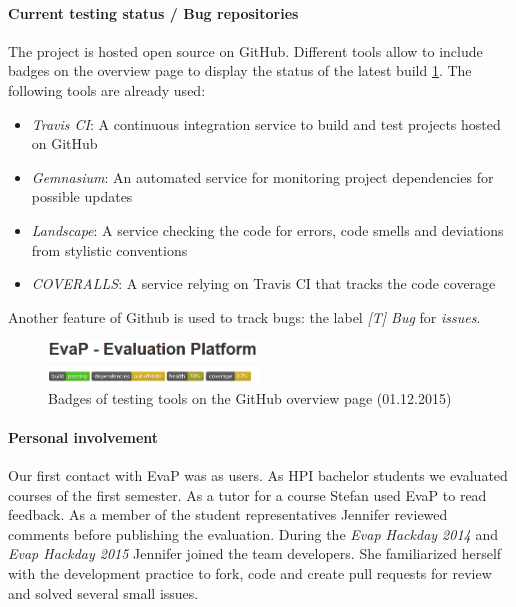 \paragraph{Current testing status / Bug repositories}
The project is hosted open source on GitHub.
Different tools allow to include badges on the overview page to display the status of the latest build \ref{fig:testing-tools}.
The following tools are already used:
\begin{itemize}
    \item \emph{Travis CI}: 
    A continuous integration service to build and test projects hosted on GitHub
    \item \emph{Gemnasium}:
     An automated service for monitoring project dependencies for possible updates
     \item \emph{Landscape}:
     A service checking the code for errors, code smells and deviations from stylistic conventions
     \item  \emph{COVERALLS}:
     A service relying on Travis CI that tracks the code coverage
\end{itemize}
Another feature of Github is used to track bugs: the label \emph{[T] Bug} for \emph{issues}.
\begin{figure}[h]
    \centering
    \includegraphics[width=0.5\textwidth, keepaspectratio]{graphics/testing-tools-github}
    \caption{Badges of testing tools on the GitHub overview page (01.12.2015)}
    \label{fig:testing-tools}
\end{figure}


\paragraph{Personal involvement}
Our first contact with EvaP was as users. 
As HPI bachelor students we evaluated courses of the first semester.
As a tutor for a course Stefan used EvaP to read feedback.
As a member of the student representatives Jennifer reviewed comments before publishing the evaluation.
During the \emph{Evap Hackday 2014} and \emph{Evap Hackday 2015} Jennifer joined the team developers.
She familiarized herself with the development practice to fork, code and create pull requests for review and solved several small issues.
